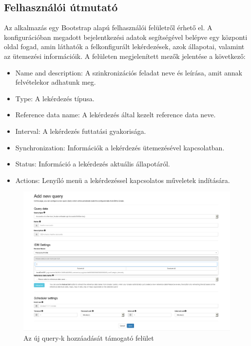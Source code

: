 \subsection{Felhasználói útmutató}

Az alkalmazás egy Bootstrap alapú felhasználói felületről érhető el. A konfigurációban megadott bejelentkezési adatok segítségével belépve egy központi oldal fogad, amin láthatók a felkonfigurált lekérdezések, azok állapotai, valamint az ütemezési információik. A felületen megjelenített mezők jelentése a következő:



\begin{itemize}
	\item Name and description: A szinkronizációs feladat neve és leírása, amit annak felvételekor adhatunk meg.
	\item Type: A lekérdezés típusa.
	\item Reference data name: A lekérdezés által kezelt reference data neve.
	\item Interval: A lekérdezés futtatási gyakorisága.
	\item Synchronization: Információk a lekérdezés ütemezésével kapcsolatban.
	\item Status: Információ a lekérdezés aktuális állapotáról.
	\item Actions: Lenyíló menü a lekérdezéssel kapcsolatos műveletek indítására.
\end{itemize}
\begin{figure}[!h]
	\centering
	\includegraphics[width=0.8\linewidth]{figures/refloader_ui/add_new2}
	\caption{Az új query-k hozzáadását támogató felület}
	\label{fig:addnew}
\end{figure}

